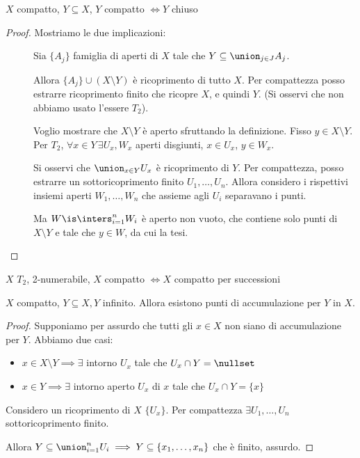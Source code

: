 \begin{prop}
 $X$ compatto, $Y\subseteq X$,  $Y$ compatto $\iff Y$ chiuso
\end{prop}
\begin{proof}
Mostriamo le due implicazioni:
\begin{description}
	\item[\proofleftarrow]
		Sia $ \{ A_j  \}$ famiglia di aperti di $X$ tale che $Y\subseteq \union_{j\in J}A_j$.

		Allora $ \{ A_j  \} \cup (X\setminus Y)$ è ricoprimento di tutto $X$.
		Per compattezza posso estrarre ricoprimento finito che ricopre $X$, e quindi $Y$. (Si osservi che non abbiamo usato l'essere $T_2$).
 \item[\proofrightarrow]
		Voglio mostrare che $X\setminus Y$ è aperto sfruttando la definizione.
		Fisso $y\in X\setminus Y$. Per $T_2$, $\forall x\in Y\, \exists U_x, W_x$ aperti disgiunti, $x\in U_x$, $y\in W_x.$
		 
		Si osservi che $\union_{x\in Y}U_x$ è ricoprimento di $Y$. Per compattezza, posso estrarre un sottoricoprimento finito $U_1,\dots, U_n$.
		Allora considero i rispettivi insiemi aperti $W_1,\dots, W_n$ che assieme agli $U_i$ separavano i punti.

		Ma $W\is \inters_{i=1}^nW_i$ è aperto non vuoto, che contiene solo punti di $X\setminus Y$ e tale che $y\in W$, da cui la tesi. \qedhere
	\end{description}
\end{proof}
 
\begin{prop}
 $X$ $T_2$, 2-numerabile, $ X$ compatto $\iff X$ compatto per successioni
\end{prop}
 \begin{lemma}
  $X$ compatto, $Y\subseteq X, Y$ infinito. Allora esistono punti di accumulazione per $Y$ in $X$.
 \end{lemma}
 \begin{proof}
  Supponiamo per assurdo che tutti gli $x\in X$ non siano di accumulazione per $Y$. Abbiamo due casi:
	\begin{itemize}
	 \item $x\in X\setminus Y\implies \exists$ intorno $U_x$ tale che $U_x\cap Y = \nullset$
	 \item $x\in Y\implies \exists$ intorno aperto $U_x$ di $x$ tale che $U_x\cap Y = \{ x \}$
	\end{itemize}
  Considero un ricoprimento di $X$ $\{ U_x \}$. Per compattezza $\exists U_1,\dots, U_n$ sottoricoprimento finito.
  
  Allora $Y\subseteq \union_{i=1}^nU_i\implies Y\subseteq \left \{ x_1,\dots,x_n\right \}$ che è finito, assurdo.
 \end{proof}







